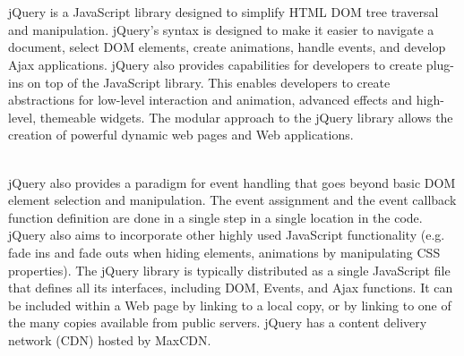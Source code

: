 \documentclass[12pt,a4paper]{report}
\begin{document}
\\
\\
\par
jQuery is a JavaScript library designed to simplify HTML DOM tree traversal and manipulation. jQuery's syntax is designed to make it easier to navigate a document, select DOM elements, create animations, handle events, and develop Ajax applications. jQuery also provides capabilities for developers to create plug-ins on top of the JavaScript library. This enables developers to create abstractions for low-level interaction and animation, advanced effects and high-level, themeable widgets. The modular approach to the jQuery library allows the creation of powerful dynamic web pages and Web applications.
\\
\\\par
jQuery also provides a paradigm for event handling that goes beyond basic DOM element selection and manipulation. The event assignment and the event callback function definition are done in a single step in a single location in the code. jQuery also aims to incorporate other highly used JavaScript functionality (e.g. fade ins and fade outs when hiding elements, animations by manipulating CSS properties). The jQuery library is typically distributed as a single JavaScript file that defines all its interfaces, including DOM, Events, and Ajax functions. It can be included within a Web page by linking to a local copy, or by linking to one of the many copies available from public servers. jQuery has a content delivery network (CDN) hosted by MaxCDN.
\end{document}
